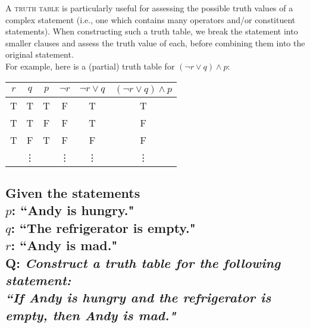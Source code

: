\documentclass{article}
\begin{document}
\textsc{A truth table} is particularly useful for assessing the possible truth values of a complex statement (i.e., one which contains many operators and/or constituent statements). When constructing such a truth table, we break the statement into smaller clauses and assess the truth value of each, before combining them into the original statement.\\
For example, here is a (partial) truth table for $(\neg r\vee q)\wedge p$:
\begin{center}
\begin{tabular}{ccc|c|c|c}
$r$&$q$&$p$&$\neg r$&$\neg r\vee q$&$(\neg r\vee q)\wedge p$\\\hline
T&T&T&F&T&T\\
T&T&F&F&T&F\\
T&F&T&F&F&F\\
\multicolumn{3}{c|}{\vdots}&\vdots&\vdots&\vdots
\end{tabular}
\end{center}

\subsection*{{\normalsize Given the statements\\
$p$: ``Andy is hungry."\\
$q$: ``The refrigerator is empty."\\
$r$: ``Andy is mad."}\\[1ex]
Q: {\em Construct a truth table for the following statement:\\
``If Andy is hungry and the refrigerator is empty, then Andy is mad."}}
\end{document}
